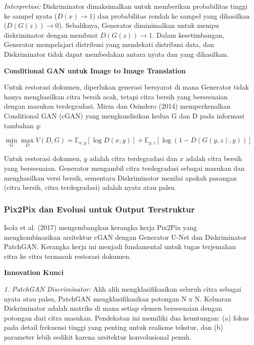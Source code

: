 \documentclass[12pt,a4paper]{article}
\begin{document}
\textit{Interpretasi:} Diskriminator dimaksimalkan untuk memberikan probabilitas tinggi ke sampel nyata ($D(x) \to 1$) dan probabilitas rendah ke sampel yang dihasilkan ($D(G(z)) \to 0$). Sebaliknya, Generator diminimalkan untuk menipu diskriminator dengan membuat $D(G(z)) \to 1$. Dalam kesetimbangan, Generator mempelajari distribusi yang mendekati distribusi data, dan Diskriminator tidak dapat membedakan antara nyata dan yang dihasilkan.

\textbf{Conditional GAN untuk Image to Image Translation}

Untuk restorasi dokumen, diperlukan generasi bersyarat di mana Generator tidak hanya menghasilkan citra bersih acak, tetapi citra bersih yang bersesuaian dengan masukan terdegradasi. Mirza dan Osindero (2014) memperkenalkan Conditional GAN (cGAN) yang mengkondisikan kedua G dan D pada informasi tambahan $y$:

\begin{equation}
\min_G \max_D V(D, G) = \mathbb{E}_{x, y}[\log D(x, y)] + \mathbb{E}_{y, z}[\log(1 - D(G(y, z), y))]
\end{equation}

Untuk restorasi dokumen, $y$ adalah citra terdegradasi dan $x$ adalah citra bersih yang bersesuaian. Generator mengambil citra terdegradasi sebagai masukan dan menghasilkan versi bersih, sementara Diskriminator menilai apakah pasangan (citra bersih, citra terdegradasi) adalah nyata atau palsu.

\subsubsection{Pix2Pix dan Evolusi untuk Output Terstruktur}
\label{subsubsec:pix2pix}

\vspace{1.5ex}

Isola et al. (2017) mengembangkan kerangka kerja Pix2Pix yang mengkombinasikan arsitektur cGAN dengan Generator U-Net dan Diskriminator PatchGAN. Kerangka kerja ini menjadi fundamental untuk tugas terjemahan citra ke citra termasuk restorasi dokumen.

\textbf{Innovation Kunci}

\textit{1. PatchGAN Discriminator:} Alih alih mengklasifikasikan seluruh citra sebagai nyata atau palsu, PatchGAN mengklasifikasikan potongan N x N. Keluaran Diskriminator adalah matriks di mana setiap elemen bersesuaian dengan potongan dari citra masukan. Pendekatan ini memiliki dua keuntungan: (a) fokus pada detail frekuensi tinggi yang penting untuk realisme tekstur, dan (b) parameter lebih sedikit karena arsitektur konvolusional penuh.
\end{document}
